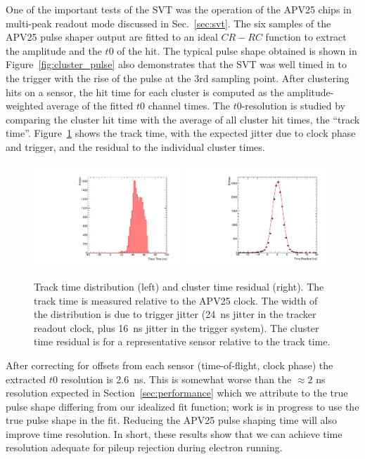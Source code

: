 One of the important tests of the SVT was the operation of the APV25 chips in multi-peak readout mode 
discussed in Sec.~\ref{sec:svt}. The six samples of the APV25 pulse shaper output 
are fitted to an ideal $CR-RC$ function to extract the amplitude and the $t0$ of the hit. 
The typical pulse shape obtained is shown in Figure~\ref{fig:cluster_pulse} also demonstrates that the SVT was well timed in to the trigger with the rise of the pulse at the 3rd sampling point.
After clustering hits on a sensor, the hit time for each cluster is computed as the amplitude-weighted average of 
the fitted $t0$ channel times. The $t0$-resolution is studied by comparing the cluster hit time with the average of all cluster hit times, the ``track time''. Figure~\ref{fig:tracktime} shows the track time, with the expected jitter due to clock phase and trigger, and the residual to the individual cluster times. 
\begin{figure}[h]
	\includegraphics[width=0.49\textwidth]{test2012/svtperformance/top_track_time.pdf}
	\includegraphics[width=0.49\textwidth]{test2012/svtperformance/t0_resolution.pdf}
	\caption{\small{Track time distribution (left) and cluster time residual (right). The 
	track time is measured relative to the APV25 clock. The width of the distribution is due to 
	trigger jitter (24~ns jitter in the tracker readout clock, plus 16~ns jitter in the trigger system). 
	The cluster time residual is for a representative sensor relative to the track time.}}
	\label{fig:tracktime}
\end{figure}
After correcting for offsets from each sensor (time-of-flight, clock phase) the extracted $t0$ resolution is 2.6~ns. This is somewhat worse than the $\approx 2$ ns resolution expected in Section~\ref{sec:performance} which we attribute to the true pulse shape differing from our idealized fit function; work is in progress to use the true pulse shape in the fit.
Reducing the APV25 pulse shaping time will also improve time resolution.
In short, these results show that we can achieve time resolution adequate for pileup rejection during electron running.


